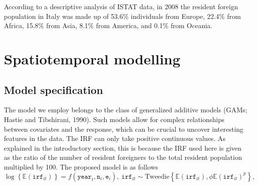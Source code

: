 According to a descriptive analysis of ISTAT data, in 2008 the resident foreign population in Italy was made up of 53.6\% individuals from Europe, 22.4\% from Africa, 15.8\% from Asia, 8.1\% from America, and 0.1\% from Oceania.

\section{Spatiotemporal modelling \label{METH}}

\subsection{Model specification \label{MS}}

The model we employ belongs to the class of generalized additive models (GAMs; Hastie and Tibshirani, 1990). Such models allow for complex relationships between covariates and the response, which can be crucial to uncover interesting features in the data. The IRF can only take positive continuous values. As explained in the introductory section, this is because the IRF used here is given as the ratio of the number of resident foreigners to the total resident population multiplied by 100. The proposed model is as follows
\begin{equation}
\log \left\{\mathbb{E}(\texttt{irf}_{it})\right\} = f(\texttt{year}_t,\texttt{n}_i,\texttt{e}_i), \ \texttt{irf}_{it} \sim \text{Tweedie}\left\{\mathbb{E}(\texttt{irf}_{it}),\phi \mathbb{E}(\texttt{irf}_{it})^{p}\right\},          
\label{PropM}
\end{equation}
